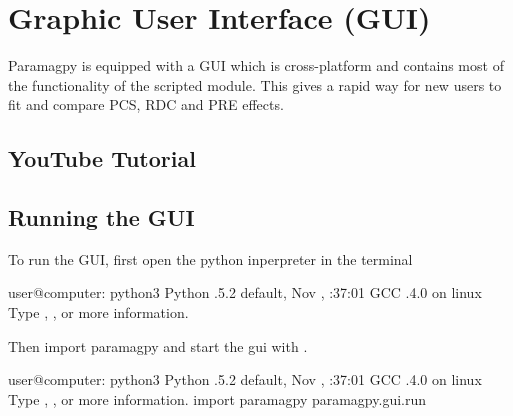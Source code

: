 \documentclass[a4paper,10pt,english]{sphinxmanual}
\begin{document}
\noindent{}


\section{Graphic User Interface (GUI)}
\label{\detokenize{paramagpy_gui:graphic-user-interface-gui}}\label{\detokenize{paramagpy_gui:paramagpy-gui}}\label{\detokenize{paramagpy_gui::doc}}
Paramagpy is equipped with a GUI which is cross-platform and contains most of the functionality of the scripted module. This gives a rapid way for new users to fit and compare PCS, RDC and PRE effects.


\subsection{YouTube Tutorial}
\label{\detokenize{paramagpy_gui:youtube-tutorial}}




\subsection{Running the GUI}
\label{\detokenize{paramagpy_gui:running-the-gui}}
To run the GUI, first open the python inperpreter in the terminal

%
\begin{sphinxVerbatim}[commandchars=\\\{\}]
user@computer:\PYGZti{}\PYGZdl{} python3
Python .5.2 default, Nov  , :37:01
\PYG{o}{[}GCC .4.0 \PYG{o}{]} on linux
Type , ,  or   more information.
\PYGZgt{}\PYGZgt{}\PYGZgt{}
\end{sphinxVerbatim}

Then import paramagpy and start the gui with .

%
\begin{sphinxVerbatim}[commandchars=\\\{\}]
user@computer:\PYGZti{}\PYGZdl{} python3
Python .5.2 default, Nov  , :37:01
\PYG{o}{[}GCC .4.0 \PYG{o}{]} on linux
Type , ,  or   more information.
\PYGZgt{}\PYGZgt{}\PYGZgt{} import paramagpy
\PYGZgt{}\PYGZgt{}\PYGZgt{} paramagpy.gui.run
\end{sphinxVerbatim}
\end{document}
